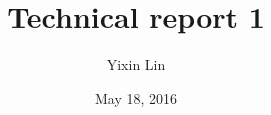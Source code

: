 \documentclass{article}
\begin{document}
\title{Technical report 1}
\author{Yixin Lin}
\date{May 18, 2016}
\maketitle






\newpage


\end{document}
